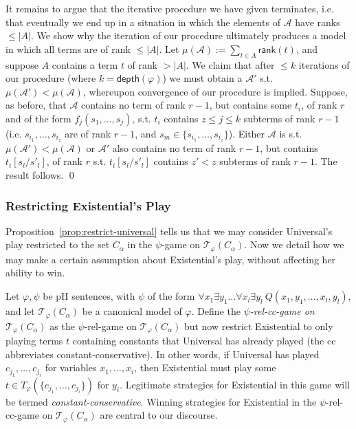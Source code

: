 \documentclass{LMCS}
\newcommand{\rank}[0]{\ensuremath{\mathsf{rank}}}
\newcommand{\depth}[0]{\ensuremath{\mathsf{depth}}}
\begin{document}
It remains to argue that the iterative procedure we have given terminates, \mbox{i.e.} that eventually we end up in a situation in which the elements of $\mathcal{A}$ have ranks $\leq |A|$. We show why the iteration of our procedure ultimately produces a model in which all terms are of rank $\leq |A|$.
Let $\mu(\mathcal{A}):=\sum_{t \in A} \rank(t)$, and suppose $A$ contains a term $t$ of rank $>|A|$.
We claim that after $\leq k$ iterations of our procedure (where $k=\depth(\varphi)$) we must obtain a $\mathcal{A}'$ s.t. $\mu(\mathcal{A}') < \mu(\mathcal{A})$, whereupon convergence of our procedure is implied.
Suppose, as before, that $\mathcal{A}$ contains no term of rank $r-1$, but contains some $t_i$, of rank $r$ and of the form $f_j(s_1,\ldots,s_j)$, s.t. $t_i$ contains $z \leq j \leq k$ subterms of rank $r-1$ (i.e. $s_{i_1},\ldots,s_{i_z}$ are of rank $r-1$, and $s_m \in \{s_{i_1},\ldots,s_{i_z}\}$). Either $\mathcal{A}$ is s.t. $\mu(\mathcal{A}') < \mu(\mathcal{A})$ or $\mathcal{A}'$ also contains no term of rank $r-1$, but contains $t_i[s_l/s'_l]$, of rank $r$ s.t. $t_i[s_l/s'_l]$ contains $z' < z$ subterms of rank $r-1$. The result follows.
\qed

\subsubsection{Restricting Existential's Play}

Proposition~\ref{prop:restrict-universal} tells us that we may consider Universal's play restricted to the set $C_\alpha$ in the $\psi$-game on $\mathcal{T}_\varphi(C_\alpha)$. Now we detail how we may make a certain assumption about Existential's play, without affecting her ability to win.

Let $\varphi,\psi$ be pH sentences, with $\psi$ of the form $\forall x_1 \exists y_1 \ldots \forall x_l \exists y_l \ Q(x_1,y_1,\ldots,x_l,y_l)$, and let $\mathcal{T}_\varphi(C_\alpha)$ be a canonical model of $\varphi$. Define the \emph{$\psi$-rel-cc-game on $\mathcal{T}_\varphi(C_\alpha)$} as the $\psi$-rel-game on $\mathcal{T}_\varphi(C_\alpha)$ but now restrict Existential to only playing terms $t$ containing constants that Universal has already played (the cc abbreviates constant-conservative). In other words, if Universal has played $c_{j_1},\ldots,c_{j_i}$ for variables $x_1,\ldots,x_i$, then Existential must play some $t \in T_\varphi(\{c_{j_1},\ldots,c_{j_i}\})$ for $y_i$. Legitimate strategies for Existential in this game will be termed \emph{constant-conservative}. Winning strategies for Existential in the $\psi$-rel-cc-game on $\mathcal{T}_\varphi(C_\alpha)$ are central to our discourse.
\end{document}
